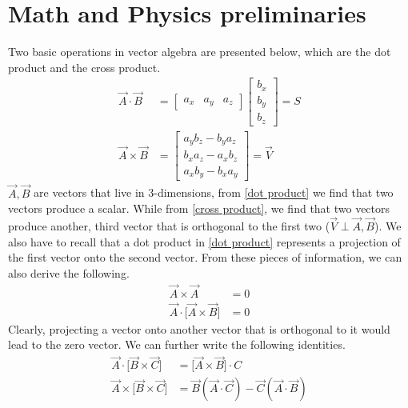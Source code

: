 \section{Math and Physics preliminaries} 
Two basic operations in vector algebra are presented below, which are the dot product and the cross product. 
\begin{align}
	\label{dot product}
	\vec{A} \cdot \vec{B} &= 
		\begin{bmatrix}
			a_{x} & a_{y} & a_{z}
		\end{bmatrix} 
		\begin{bmatrix}
			b_{x}\\
			b_{y}\\
			b_{z}
		\end{bmatrix} = S\\	
	\label{cross product}
	\vec{A} \times \vec{B} &= 
		\begin{bmatrix}
			a_{y}b_{z} - b_{y}a_{z}\\
			b_{x}a_{z} - a_{x}b_{z}\\
			a_{x}b_{y} - b_{x}a_{y}
		\end{bmatrix} = \vec{V} 
\end{align}	
$\vec{A}, \vec{B}$ are vectors that live in 3-dimensions, from \autoref{dot product} we find that two vectors produce a scalar. While from \autoref{cross product}, we find that two vectors produce another, third vector that is orthogonal to the first two ($\vec{V} \perp \vec{A}, \vec{B}$). We also have to recall that a dot product in \autoref{dot product} represents a projection of the first vector onto the second vector. From these pieces of information, we can also derive the following. 
\begin{align}
	\label{cross cross} 
	\vec{A} \times \vec{A} &= 0\\
	\label{dot cross}
	\vec{A} \cdot \Big[ \vec{A} \times \vec{B} \Big] &= 0
\end{align}
Clearly, projecting a vector onto another vector that is orthogonal to it would lead to the zero vector. We can further write the following identities. 
\begin{align}
	\vec{A} \cdot \Big[ \vec{B} \times \vec{C} \Big] &= \Big[\vec{A} \times \vec{B} \Big] \cdot C\\
	\vec{A} \times \Big[\vec{B} \times \vec{C} \Big] &= \vec{B}(\vec{A} \cdot \vec{C}) - \vec{C}(\vec{A} \cdot \vec{B})
\end{align} 
